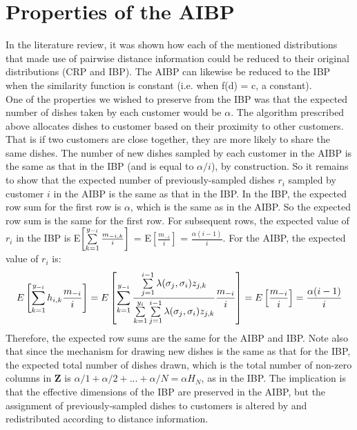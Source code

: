 \section{Properties of the AIBP}
In the literature review, it was shown how each of the mentioned distributions
that made use of pairwise distance information could be reduced to their original
distributions (CRP and IBP). The AIBP can likewise be reduced to the IBP when
the similarity function is constant (i.e. when f(d) = c, a constant).\\

\noindent
One of the properties we wished to preserve from the IBP was that the expected
number of dishes taken by each customer would be $\alpha$. The algorithm
prescribed above allocates dishes to customer based on their proximity to other
customers.  That is if two customers are close together, they are more likely
to share the same dishes. The number of new dishes sampled by each customer in
the AIBP is the same as that in the IBP (and is equal to $\alpha/i$), by
construction. So it remains to show that the expected number of
previously-sampled dishes $r_i$ sampled by customer $i$ in the AIBP is the
same as that in the IBP. In the IBP, the expected row sum for the first row is
$\alpha$, which is the same as in the AIBP. So the expected row sum is the same
for the first row. For subsequent rows, the expected value of $r_i$ in the IBP
is E$\left[\sum\limits_{k=1}^{y_{-i}} \frac{m_{-i,k}}{i}\right]$ =
E$\left[\frac{m_{-i}}{i}\right]$ = $\frac{\alpha(i-1)}{i}$. For the AIBP, the
expected value of $r_i$ is:
\[
  E\left[\sum\limits_{k=1}^{y_{-i}} h_{i,k} \frac{m_{-i}}{i}\right] = 
  E\left[\sum\limits_{k=1}^{y_{-i}}\displaystyle\frac{\sum\limits_{j=1}^{i-1}\lambda(\sigma_j,\sigma_i)z_{j,k}} {\sum\limits_{k=1}^{y_i}\sum\limits_{j=1}^{i-1}\lambda(\sigma_j,\sigma_i)z_{j,k}} \frac{m_{-i}}{i}\right] = 
  E\left[\frac{m_{-i}}{i}\right] = \frac{\alpha(i-1)}{i}
\]
Therefore, the expected row sums are the same for the AIBP and IBP. Note also
that since the mechanism for drawing new dishes is the same as that for the
IBP, the expected total number of dishes drawn, which is the total number of
non-zero columns in $\bm Z$ is $\alpha/1+\alpha/2+...+\alpha/N = \alpha H_N$, as
in the IBP.  The implication is that the effective dimensions of the IBP are
preserved in the AIBP, but the assignment of previously-sampled dishes to 
customers is altered by and redistributed according to distance information.\\

